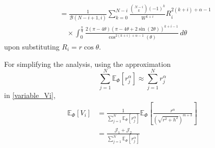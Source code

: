 \documentclass[slidestop,usepdftitle=false]{gvvslides}
\providecommand{\sbrak}[1]{\ensuremath{{}\left[#1\right]}}
\providecommand{\brak}[1]{\ensuremath{\left(#1\right)}}
\providecommand{\lbrak}[1]{\ensuremath{\left(#1\right.}}
\providecommand{\rbrak}[1]{\ensuremath{\left.#1\right)}}
\begin{document}
\begin{frame}
\begin{align}
   & = \frac{1}{\mathcal{B}\brak{N-i+1,i}}\sum_{k=0}^{N-i}\frac{\binom{N-i}{k}(-1)^k}{W^{k+i}}
   R_i^{2\brak{k+i}+\alpha-1} \nonumber \\
   &\quad \times \int_{0}^{\frac{\pi}{4}} \frac{2\brak{\pi-4\theta}\brak{\pi-4\theta+2\sin\brak{2\theta}}^{k+i-1} }{\cos^{2\brak{k+i}+\alpha-1}\brak{\theta}}\,d \theta
   \end{align}
   upon substituting $R_i = r \cos \theta$.
\label{app_Pe}
 \end{frame}
 \begin{frame}
 For simplifying the analysis, using the approximation
\begin{equation}
\sum_{j=1}^N\mathbb{E}_{\Phi}\sbrak{r_j^{\alpha}} \approx \sum_{j=1}^Nr_j^{\alpha}
\end{equation}
in \eqref{variable_Vi},
   \begin{align}
   \mathbb{E}_{\Phi}\sbrak{V_i}&=\frac{1}{\sum_{j=1}^N\mathbb{E}_{\Phi}\sbrak{r_j^{\alpha}} }\mathbb{E}_{\Phi}\sbrak{\frac{r^{\alpha}}{\brak{\sqrt{r^2+h^2}}^{m+3}}} \\
    & =  \frac{ \mathcal{J}_1 + \mathcal{J}_2}{\sum_{j=1}^N\mathbb{E}_{\Phi}\sbrak{r_j^{\alpha}} }
   \end{align}
   \end{frame}
\end{document}
